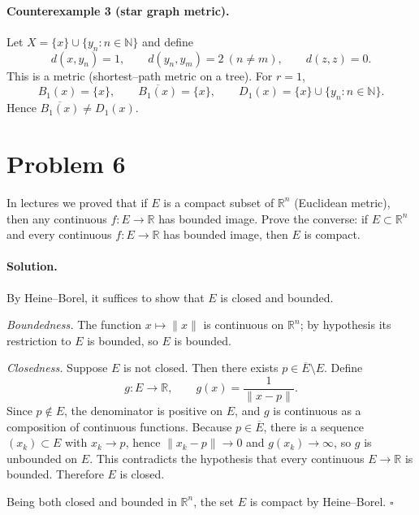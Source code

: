 \documentclass[12pt,a4paper]{article}
\newcommand{\qed}{\hfill$\square$}
\theoremstyle{plain}
\theoremstyle{definition}
\theoremstyle{remark}
\theoremstyle{remark}
\begin{document}
\noindent\hrulefill

\paragraph{Counterexample 3 (star graph metric).}
Let $X=\{x\}\cup\{y_n:n\in\mathbb{N}\}$ and define
\[
d(x,y_n)=1,\qquad d(y_n,y_m)=2\ (n\ne m),\qquad d(z,z)=0.
\]
This is a metric (shortest–path metric on a tree).
For $r=1$,
\[
B_1(x)=\{x\},\qquad \overline{B_1(x)}=\{x\},\qquad
D_1(x)=\{x\}\cup\{y_n:n\in\mathbb{N}\}.
\]
Hence $\overline{B_1(x)}\neq D_1(x)$.

\section*{Problem 6}
In lectures we proved that if $E$ is a compact subset of $\mathbb{R}^n$ (Euclidean metric), then any
continuous $f:E\to\mathbb{R}$ has bounded image. Prove the converse: if $E\subset\mathbb{R}^n$
and every continuous $f:E\to\mathbb{R}$ has bounded image, then $E$ is compact.

\paragraph{Solution.}
By Heine--Borel, it suffices to show that $E$ is closed and bounded.

\emph{Boundedness.} The function $x\mapsto \|x\|$ is continuous on $\mathbb{R}^n$; by hypothesis
its restriction to $E$ is bounded, so $E$ is bounded.

\emph{Closedness.} Suppose $E$ is not closed. Then there exists $p\in \overline{E}\setminus E$.
Define
\[
g:E\to\mathbb{R},\qquad g(x)=\frac{1}{\|x-p\|}.
\]
Since $p\notin E$, the denominator is positive on $E$, and $g$ is continuous as a composition of
continuous functions. Because $p\in\overline{E}$, there is a sequence $(x_k)\subset E$ with
$x_k\to p$, hence $\|x_k-p\|\to0$ and $g(x_k)\to\infty$, so $g$ is unbounded on $E$.
This contradicts the hypothesis that every continuous $E\to\mathbb{R}$ is bounded. Therefore
$E$ is closed.

Being both closed and bounded in $\mathbb{R}^n$, the set $E$ is compact by Heine--Borel.
\qed
\end{document}
